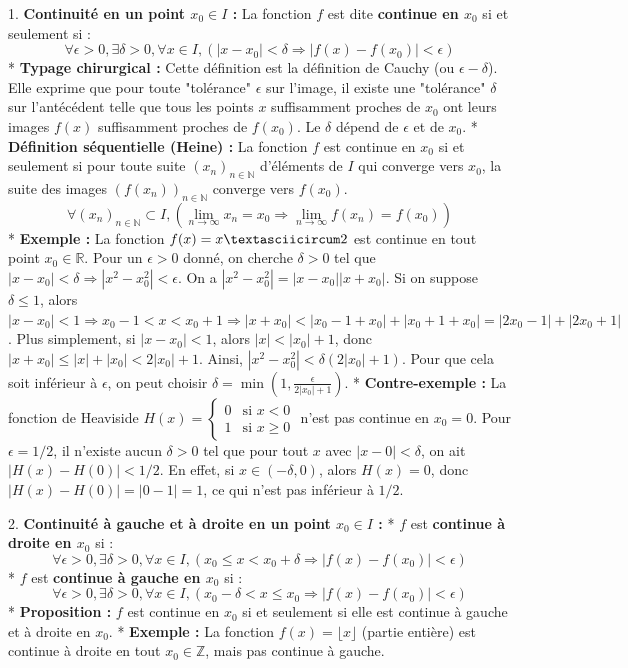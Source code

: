 \documentclass[12pt,a4paper]{report}
\begin{document}
1.  \textbf{Continuité en un point $x_0 \in I$ :}
    La fonction $f$ est dite \textbf{continue en $x_0$} si et seulement si :
    $$\forall \epsilon > 0, \exists \delta > 0, \forall x \in I, (|x - x_0| < \delta \Rightarrow |f(x) - f(x_0)| < \epsilon)$$
    *   \textbf{Typage chirurgical :} Cette définition est la définition de Cauchy (ou $\epsilon-\delta$). Elle exprime que pour toute "tolérance" $\epsilon$ sur l'image, il existe une "tolérance" $\delta$ sur l'antécédent telle que tous les points $x$ suffisamment proches de $x_0$ ont leurs images $f(x)$ suffisamment proches de $f(x_0)$. Le $\delta$ dépend de $\epsilon$ et de $x_0$.
    *   \textbf{Définition séquentielle (Heine) :} La fonction $f$ est continue en $x_0$ si et seulement si pour toute suite $(x_n)_{n \in \mathbb{N}}$ d'éléments de $I$ qui converge vers $x_0$, la suite des images $(f(x_n))_{n \in \mathbb{N}}$ converge vers $f(x_0)$.
        $$\forall (x_n)_{n \in \mathbb{N}} \subset I, (\lim_{n \to \infty} x_n = x_0 \Rightarrow \lim_{n \to \infty} f(x_n) = f(x_0))$$
    *   \textbf{Exemple :} La fonction $f(x) = x\textasciicircum 2$ est continue en tout point $x_0 \in \mathbb{R}$. Pour un $\epsilon > 0$ donné, on cherche $\delta > 0$ tel que $|x - x_0| < \delta \Rightarrow |x^2 - x_0^2| < \epsilon$. On a $|x^2 - x_0^2| = |x - x_0||x + x_0|$. Si on suppose $\delta \le 1$, alors $|x - x_0| < 1 \Rightarrow x_0 - 1 < x < x_0 + 1 \Rightarrow |x + x_0| < |x_0 - 1 + x_0| + |x_0 + 1 + x_0| = |2x_0 - 1| + |2x_0 + 1|$. Plus simplement, si $|x-x_0|<1$, alors $|x|<|x_0|+1$, donc $|x+x_0| \le |x|+|x_0| < 2|x_0|+1$. Ainsi, $|x^2 - x_0^2| < \delta(2|x_0|+1)$. Pour que cela soit inférieur à $\epsilon$, on peut choisir $\delta = \min\left(1, \frac{\epsilon}{2|x_0|+1}\right)$.
    *   \textbf{Contre-exemple :} La fonction de Heaviside $H(x) = \begin{cases} 0 & \text{si } x < 0 \\ 1 & \text{si } x \ge 0 \end{cases}$ n'est pas continue en $x_0 = 0$.
        Pour $\epsilon = 1/2$, il n'existe aucun $\delta > 0$ tel que pour tout $x$ avec $|x - 0| < \delta$, on ait $|H(x) - H(0)| < 1/2$. En effet, si $x \in (-\delta, 0)$, alors $H(x) = 0$, donc $|H(x) - H(0)| = |0 - 1| = 1$, ce qui n'est pas inférieur à $1/2$.

2.  \textbf{Continuité à gauche et à droite en un point $x_0 \in I$ :}
    *   $f$ est \textbf{continue à droite en $x_0$} si :
        $$\forall \epsilon > 0, \exists \delta > 0, \forall x \in I, (x_0 \le x < x_0 + \delta \Rightarrow |f(x) - f(x_0)| < \epsilon)$$
    *   $f$ est \textbf{continue à gauche en $x_0$} si :
        $$\forall \epsilon > 0, \exists \delta > 0, \forall x \in I, (x_0 - \delta < x \le x_0 \Rightarrow |f(x) - f(x_0)| < \epsilon)$$
    *   \textbf{Proposition :} $f$ est continue en $x_0$ si et seulement si elle est continue à gauche et à droite en $x_0$.
    *   \textbf{Exemple :} La fonction $f(x) = \lfloor x \rfloor$ (partie entière) est continue à droite en tout $x_0 \in \mathbb{Z}$, mais pas continue à gauche.
\end{document}
